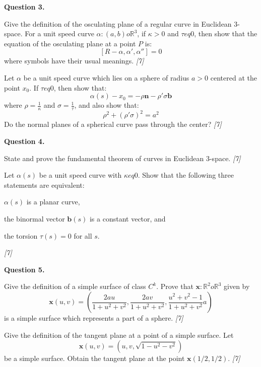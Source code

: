 \documentclass[11pt,a4paper]{article}
\newcommand{\pts}[1]{\hfill   \textit{[#1]}}
\begin{document}
\medskip


\noindent   \textbf{Question 3.}

\begin{parts}
  \item Give the definition of the osculating plane of a regular curve in Euclidean 3-space. For a unit speed curve $\alpha : (a,b)  o \mathbb{R}^3$, if $\kappa > 0$ and $ \tau 
eq 0$, then show that the equation of the osculating plane at a point $P$ is:
  \[ [R - \alpha, \alpha', \alpha''] = 0 \]
  where symbols have their usual meanings. \pts{7}
  \item Let $\alpha$ be a unit speed curve which lies on a sphere of radius $a > 0$ centered at the point $x_0$. If $ \tau 
eq 0$, then show that:
  \[ \alpha(s) - x_0 = -\rho \mathbf{n} - \rho' \sigma \mathbf{b} \]
  where $\rho = \frac{1}{\kappa}$ and $\sigma = \frac{1}{ \tau}$, and also show that:
  \[ \rho^2 + (\rho' \sigma)^2 = a^2 \]
  Do the normal planes of a spherical curve pass through the center? \pts{7}
\end{parts}

\medskip


\noindent   \textbf{Question 4.}

\begin{parts}
  \item State and prove the fundamental theorem of curves in Euclidean 3-space. \pts{7}
  \item Let $\alpha(s)$ be a unit speed curve with $\kappa 
eq 0$. Show that the following three statements are equivalent:
  
\begin{parts}
    \item $\alpha(s)$ is a planar curve,
    \item the binormal vector $\mathbf{b}(s)$ is a constant vector, and
    \item the torsion $ \tau(s) = 0$ for all $s$.
  \end{parts} \pts{7}
\end{parts}

\medskip


\noindent   \textbf{Question 5.}

\begin{parts}
  \item Give the definition of a simple surface of class $C^k$. Prove that $\mathbf{x} : \mathbb{R}^2  o \mathbb{R}^3$ given by
  \[ \mathbf{x}(u,v) = \left( \frac{2au}{1+u^2+v^2}, \frac{2av}{1+u^2+v^2}, \frac{u^2+v^2-1}{1+u^2+v^2} a \right) \]
  is a simple surface which represents a part of a sphere. \pts{7}
  \item Give the definition of the tangent plane at a point of a simple surface. Let
  \[ \mathbf{x}(u,v) = \left( u, v, \sqrt{1-u^2-v^2} \right) \]
  be a simple surface. Obtain the tangent plane at the point $\mathbf{x}(1/2, 1/2)$. \pts{7}
\end{parts}
\end{document}
